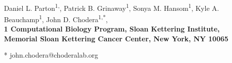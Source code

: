 \documentclass[10pt,letterpaper]{article}
\date{}
\begin{document}
\vspace*{0.35in}

\begin{flushleft}
{\Large
\textbf{}
}
\newline
\\
Daniel L. Parton\textsuperscript{1,},
Patrick B. Grinaway\textsuperscript{1},
Sonya M. Hansom\textsuperscript{1},
Kyle A. Beauchamp\textsuperscript{1},
John D. Chodera\textsuperscript{1,*},
\\
\bigskip
\bf{1} Computational Biology Program, Sloan Kettering Institute, Memorial Sloan Kettering Cancer Center, New York, NY 10065
\\
\bigskip

% 
%

* john.chodera@choderalab.org

\end{flushleft}
\end{document}
